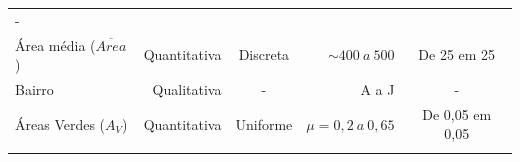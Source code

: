 \documentclass[
  a4paper, 11pt]{article}
\begin{document}
\begin{longtable}[]{@{}lrcrc@{}}
\begin{minipage}[t]{0.19\columnwidth}
-\strut
\end{minipage}\tabularnewline
\begin{minipage}[t]{0.22\columnwidth}\raggedright
Área média (\(\overline{Area}\))\strut
\end{minipage} & \begin{minipage}[t]{0.10\columnwidth}\raggedleft
Quantitativa\strut
\end{minipage} & \begin{minipage}[t]{0.10\columnwidth}\centering
Discreta\strut
\end{minipage} & \begin{minipage}[t]{0.25\columnwidth}\raggedleft
\(\sim 400 \ a \ 500\)\strut
\end{minipage} & \begin{minipage}[t]{0.19\columnwidth}\centering
De 25 em 25\strut
\end{minipage}\tabularnewline
\begin{minipage}[t]{0.22\columnwidth}\raggedright
Bairro\strut
\end{minipage} & \begin{minipage}[t]{0.10\columnwidth}\raggedleft
Qualitativa\strut
\end{minipage} & \begin{minipage}[t]{0.10\columnwidth}\centering
-\strut
\end{minipage} & \begin{minipage}[t]{0.25\columnwidth}\raggedleft
A a J\strut
\end{minipage} & \begin{minipage}[t]{0.19\columnwidth}\centering
-\strut
\end{minipage}\tabularnewline
\begin{minipage}[t]{0.22\columnwidth}\raggedright
Áreas Verdes (\(A_V\))\strut
\end{minipage} & \begin{minipage}[t]{0.10\columnwidth}\raggedleft
Quantitativa\strut
\end{minipage} & \begin{minipage}[t]{0.10\columnwidth}\centering
Uniforme\strut
\end{minipage} & \begin{minipage}[t]{0.25\columnwidth}\raggedleft
\(\mu = 0,2 \ a \ 0,65\)\strut
\end{minipage} & \begin{minipage}[t]{0.19\columnwidth}\centering
De 0,05 em 0,05\strut
\end{minipage}\tabularnewline
\begin{minipage}[t]{0.22\columnwidth}\raggedright

\end{minipage}
\end{longtable}
\end{document}
